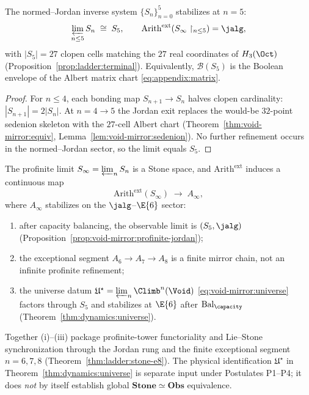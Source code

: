 \begin{proposition}\label{prop:void-mirror:profinite-jordan}
The normed--Jordan inverse system $\{S_n\}_{n=0}^{5}$ stabilizes at $n=5$:
\[
  \varprojlim_{n\leq5} S_n\;\cong\;S_5,
  \qquad
  \mathrm{Arith}^{\mathrm{ext}}(S_\infty\restriction_{n\leq5})=\jalg,
\]
with $|S_5|=27$ clopen cells matching the $27$ real coordinates of
$H_3(\Oct)$ (Proposition~\ref{prop:ladder:terminal}). Equivalently,
$\mathcal{B}(S_5)$ is the Boolean envelope of the Albert matrix chart
\eqref{eq:appendix:matrix}.
\end{proposition}

\begin{proof}
For $n\leq4$, each bonding map $S_{n+1}\to S_n$ halves clopen cardinality:
$|S_{n+1}|=2|S_n|$. At $n=4\to5$ the Jordan exit replaces the would-be
$32$-point sedenion skeleton with the $27$-cell Albert chart
(Theorem~\ref{thm:void-mirror:equiv}, Lemma~\ref{lem:void-mirror:sedenion}).
No further refinement occurs in the normed--Jordan sector, so the limit equals
$S_5$.
\end{proof}

\begin{proposition}\label{prop:void-mirror:profinite-func}
The profinite limit $S_\infty=\varprojlim_n S_n$ is a Stone space, and
$\mathrm{Arith}^{\mathrm{ext}}$ induces a continuous map
\[
  \mathrm{Arith}^{\mathrm{ext}}(S_\infty)\;\longrightarrow\;A_\infty,
\]
where $A_\infty$ stabilizes on the $\jalg$--$\E{6}$ sector:
\begin{enumerate}[label=(\roman*),leftmargin=*]
  \item after capacity balancing, the observable limit is
    $(S_5,\jalg)$ (Proposition~\ref{prop:void-mirror:profinite-jordan});
  \item the exceptional segment $A_6\to A_7\to A_8$ is a finite mirror chain,
    not an infinite profinite refinement;
  \item the universe datum $\mathfrak{U}^\star=\varprojlim_n\Climb^n(\Void)$
    \eqref{eq:void-mirror:universe} factors through $S_5$ and stabilizes at
    $\E{6}$ after $\mathrm{Bal}_\capacity$
    (Theorem~\ref{thm:dynamics:universe}).
\end{enumerate}
Together (i)--(iii) package profinite-tower functoriality and Lie--Stone
synchronization through the Jordan rung and the finite exceptional segment
$n=6,7,8$ (Theorem~\ref{thm:ladder:stone-e8}). The physical identification
$\mathfrak{U}^\star$ in Theorem~\ref{thm:dynamics:universe} is separate input
under Postulates P1--P4; it does \emph{not} by itself establish global
$\mathbf{Stone}\simeq\mathbf{Obs}$ equivalence.
\end{proposition}

